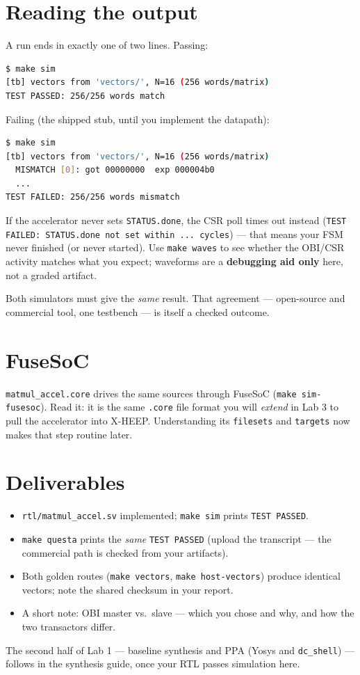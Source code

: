 \documentclass[11pt]{article}
\newcommand{\code}[1]{\texttt{#1}}
\begin{document}
\section{Reading the output}

A run ends in exactly one of two lines. Passing:

\begin{lstlisting}[language=bash]
$ make sim
[tb] vectors from 'vectors/', N=16 (256 words/matrix)
TEST PASSED: 256/256 words match
\end{lstlisting}

Failing (the shipped stub, until you implement the datapath):

\begin{lstlisting}[language=bash]
$ make sim
[tb] vectors from 'vectors/', N=16 (256 words/matrix)
  MISMATCH [0]: got 00000000  exp 000004b0
  ...
TEST FAILED: 256/256 words mismatch
\end{lstlisting}

If the accelerator never sets \code{STATUS.done}, the CSR poll times out
instead (\code{TEST FAILED: STATUS.done not set within ... cycles}) --- that
means your FSM never finished (or never started). Use \code{make waves} to see
whether the OBI/CSR activity matches what you expect; waveforms are a
\textbf{debugging aid only} here, not a graded artifact.

Both simulators must give the \emph{same} result. That agreement --- open-source
and commercial tool, one testbench --- is itself a checked outcome.

\section{FuseSoC}

\code{matmul\_accel.core} drives the same sources through FuseSoC
(\code{make sim-fusesoc}). Read it: it is the same \code{.core} file format you
will \emph{extend} in Lab 3 to pull the accelerator into X-HEEP. Understanding
its \code{filesets} and \code{targets} now makes that step routine later.

\section*{Deliverables}

\begin{itemize}[nosep]
  \item \code{rtl/matmul\_accel.sv} implemented; \code{make sim} prints
        \code{TEST PASSED}.
  \item \code{make questa} prints the \emph{same} \code{TEST PASSED} (upload the
        transcript --- the commercial path is checked from your artifacts).
  \item Both golden routes (\code{make vectors}, \code{make host-vectors})
        produce identical vectors; note the shared checksum in your report.
  \item A short note: OBI master vs.\ slave --- which you chose and why, and how
        the two transactors differ.
\end{itemize}

The second half of Lab 1 --- baseline synthesis and PPA (Yosys and
\code{dc\_shell}) --- follows in the synthesis guide, once your RTL passes
simulation here.
\end{document}

